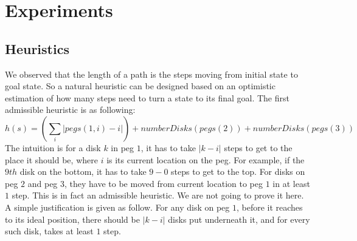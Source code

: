 \section{Experiments}\label{sec:exp}




\subsection{Heuristics}
We observed that the length of a path is the steps moving from initial state to goal state. So a natural heuristic can be designed based on an optimistic estimation of how many steps need to turn a state to its final goal. The first admissible heuristic is as following:
\[
h(s) = (\sum_i |pegs(1,i)-i| ) + numberDisks(pegs(2)) + numberDisks(pegs(3))
\]
The intuition is for a disk $k$ in peg $1$, it has to take $|k-i|$ steps to get to the place it should be, where $i$ is its current location on the peg. For example, if the $9th$ disk on the bottom, it has to take $9-0$ steps to get to the top. For disks on peg $2$ and peg $3$, they have to be moved from current location to peg $1$ in at least $1$ step. This is in fact an admissible heuristic. We are not going to prove it here. A simple justification is given as follow. For any disk on peg $1$, before it reaches to its ideal position, there should be $|k-i|$ disks put underneath it, and for every such disk, takes at least $1$ step. 

